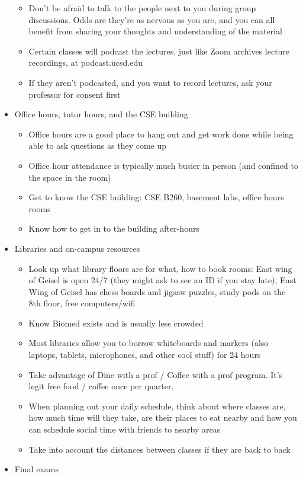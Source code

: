 \documentclass[12pt, oneside]{article}
\begin{document}
\begin{itemize}
\begin{itemize}
\item Don't be afraid to talk to the people next to you during group discussions. Odds are they're as nervous as you are, and you can all benefit from sharing your thoughts and understanding of the material 
\item Certain classes will podcast the lectures, just like Zoom archives lecture recordings, at podcast.ucsd.edu
\item If they aren't podcasted, and you want to record lectures, ask your professor for consent first
\end{itemize}
\item Office hours, tutor hours, and the CSE building
\begin{itemize}
\item Office hours are a good place to hang out and get work done while being able to ask questions as they come up 
\item Office hour attendance is typically much busier in person (and confined to the space in the room)
\item Get to know the CSE building: CSE B260, basement labs, office hours rooms
\item Know how to get in to the building after-hours
\end{itemize}
\item Libraries and on-campus resources
\begin{itemize}
\item Look up what library floors are for what, how to book rooms: East wing of Geisel is open 24/7 (they might ask to see an ID if you stay late), East Wing of Geisel has chess boards and jigsaw puzzles, study pods on the 8th floor, 
free computers/wifi
\item Know Biomed exists and is usually less crowded
\item Most libraries allow you to borrow whiteboards and markers (also laptops, tablets, microphones, and other cool stuff) for 24 hours
\item Take advantage of Dine with a prof / Coffee with a prof program. It's legit free food / coffee once per quarter. 
\item When planning out your daily schedule, think about where classes are, how much time will they take, are their places to eat nearby and how you can schedule social time with friends to nearby areas 
\item Take into account the distances between classes if they are back to back
\end{itemize} 
\item Final exams

\end{itemize}
\end{document}
